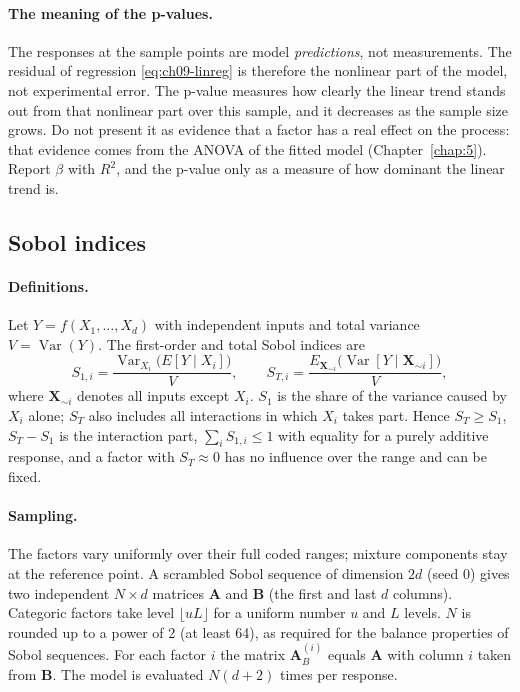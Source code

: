 \paragraph{The meaning of the p-values.} The responses at the sample points are model \emph{predictions}, not
measurements. The residual of regression \eqref{eq:ch09-linreg} is therefore the nonlinear part of the model, not
experimental error. The p-value measures how clearly the linear trend stands out from that nonlinear part over this
sample, and it decreases as the sample size grows. Do not present it as evidence that a factor has a real effect on the
process: that evidence comes from the ANOVA of the fitted model (Chapter~\ref{chap:5}). Report $\beta$ with $R^2$, and the p-value
only as a measure of how dominant the linear trend is.

\subsection{Sobol indices}
\paragraph{Definitions.} Let $Y=f(X_1,\dots,X_d)$ with independent inputs and total variance $V=\operatorname{Var}(Y)$.
The first-order and total Sobol indices \citep{sobol2001} are
\begin{equation}
S_{1,i}=\frac{\operatorname{Var}_{X_i}\!\bigl(E[Y\mid X_i]\bigr)}{V},\qquad
S_{T,i}=\frac{E_{\mathbf X_{\sim i}}\!\bigl(\operatorname{Var}[Y\mid\mathbf X_{\sim i}]\bigr)}{V},
\label{eq:ch09-sobol-def}
\end{equation}
where $\mathbf X_{\sim i}$ denotes all inputs except $X_i$. $S_1$ is the share of the variance caused by $X_i$ alone;
$S_T$ also includes all interactions in which $X_i$ takes part. Hence $S_T\ge S_1$, $S_T-S_1$ is the interaction part,
$\sum_i S_{1,i}\le1$ with equality for a purely additive response, and a factor with $S_T\approx0$ has no influence
over the range and can be fixed.

\paragraph{Sampling.} The factors vary uniformly over their full coded ranges; mixture components stay at the reference
point. A scrambled Sobol sequence of dimension $2d$ (seed 0) gives two independent $N\times d$ matrices $\mathbf A$ and
$\mathbf B$ (the first and last $d$ columns). Categoric factors take level $\lfloor uL\rfloor$ for a uniform number $u$
and $L$ levels. $N$ is rounded up to a power of 2 (at least 64), as required for the balance properties of Sobol
sequences. For each factor $i$ the matrix $\mathbf A_B^{(i)}$ equals $\mathbf A$ with column $i$ taken from
$\mathbf B$. The model is evaluated $N(d+2)$ times per response.

